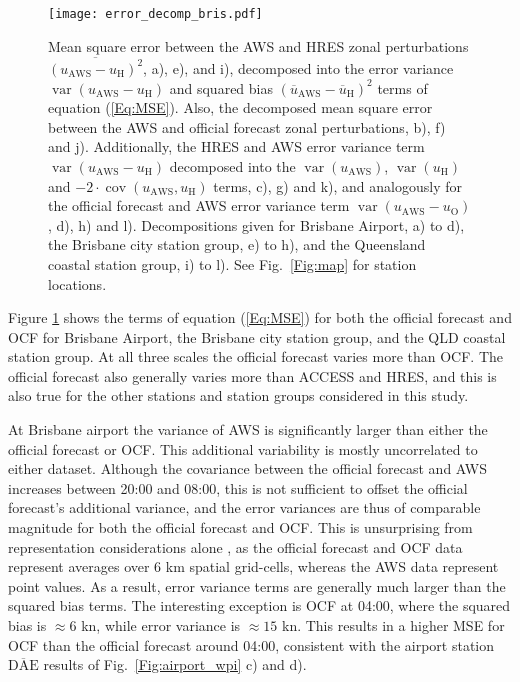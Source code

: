 \documentclass[twocol]{ametsoc}
\DeclareMathOperator{\cov}{cov}
\DeclareMathOperator{\var}{var}
\begin{document}
\begin{figure}
\centering
\texttt{[image: error\_decomp\_bris.pdf]}
\caption{Mean square error between the AWS and HRES zonal perturbations $\overline{\left(u_\text{AWS} - u_\text{H}\right)^2}$, a), e), and i), decomposed into the error variance $\var\left(u_\text{AWS} - u_\text{H}\right)$ and squared bias $\left(\overline{u}_\text{AWS} - \overline{u}_\text{H}\right)^2$ terms of equation (\ref{Eq:MSE}). Also, the decomposed mean square error between the AWS and official forecast zonal perturbations, b), f) and j). Additionally, the HRES and AWS error variance term $\var\left(u_\text{AWS} - u_\text{H}\right)$ decomposed into the $\var\left(u_\text{AWS}\right)$, $\var\left(u_\text{H}\right)$ and  $- 2 \cdot \cov\left(u_\text{AWS}, u_\text{H}\right)$ terms, c), g) and k), and analogously for the official forecast and AWS error variance term $\var\left(u_\text{AWS} - u_\text{O}\right)$, d), h) and l). Decompositions given for Brisbane Airport, a) to d), the Brisbane city station group, e) to h), and the Queensland coastal station group, i) to l). See Fig.~\ref{Fig:map} for station locations.}
\label{Fig:error_decomp_bris}
\end{figure}

Figure \ref{Fig:error_decomp_bris} shows the terms of equation (\ref{Eq:MSE}) for both the official forecast and OCF for Brisbane Airport, the Brisbane city station group, and the QLD coastal station group. At all three scales the official forecast varies more than OCF. The official forecast also generally varies more than ACCESS and HRES, and this is also true for the other stations and station groups considered in this study. 

At Brisbane airport the variance of AWS is significantly larger than either the official forecast or OCF. This additional variability is mostly uncorrelated to either dataset. Although the covariance between the official forecast and AWS increases between 20:00 and 08:00, this is not sufficient to offset the official forecast's additional variance, and the error variances are thus of comparable magnitude for both the official forecast and OCF. This is unsurprising from representation considerations alone \citep[e.g.][]{zaron06}, as the official forecast and OCF data represent averages over 6 km spatial grid-cells, whereas the AWS data represent point values. As a result, error variance terms are generally much larger than the squared bias terms. The interesting exception is OCF at 04:00, where the squared bias is $\approx 6$ kn, while error variance is $\approx 15$ kn. This results in a higher MSE for OCF than the official forecast around 04:00, consistent with the airport station $\overline{\text{DAE}}$ results of Fig.~\ref{Fig:airport_wpi} c) and d).
\end{document}
